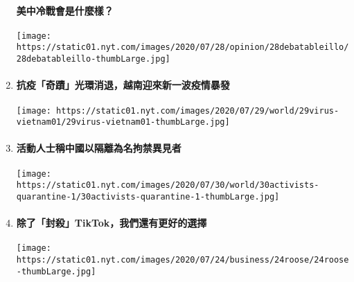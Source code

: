 \begin{enumerate}
  \hypertarget{ux7f8eux4e2dux51b7ux6230ux6703ux662fux4ec0ux9ebcux6a23}{%
  \paragraph{美中冷戰會是什麼樣？}\label{ux7f8eux4e2dux51b7ux6230ux6703ux662fux4ec0ux9ebcux6a23}}

  \texttt{[image: https://static01.nyt.com/images/2020/07/28/opinion/28debatableillo/28debatableillo-thumbLarge.jpg]}
\item
  \href{https://cn.nytimes.com/asia-pacific/20200731/coronavirus-vietnam/zh-hant/?utm_source=top10-in-article\&utm_medium=articlepage\&utm_campaign=web}{}

  \hypertarget{ux6297ux75abux5947ux8e5fux5149ux74b0ux6d88ux9000ux8d8aux5357ux8fceux4f86ux65b0ux4e00ux6ce2ux75abux60c5ux66b4ux767c}{%
  \paragraph{抗疫「奇蹟」光環消退，越南迎來新一波疫情暴發}\label{ux6297ux75abux5947ux8e5fux5149ux74b0ux6d88ux9000ux8d8aux5357ux8fceux4f86ux65b0ux4e00ux6ce2ux75abux60c5ux66b4ux767c}}

  \texttt{[image: https://static01.nyt.com/images/2020/07/29/world/29virus-vietnam01/29virus-vietnam01-thumbLarge.jpg]}
\item
  \href{https://cn.nytimes.com/china/20200731/coronavirus-china-qurantine/zh-hant/?utm_source=top10-in-article\&utm_medium=articlepage\&utm_campaign=web}{}

  \hypertarget{ux6d3bux52d5ux4ebaux58ebux7a31ux4e2dux570bux4ee5ux9694ux96e2ux70baux540dux62d8ux7981ux7570ux898bux8005}{%
  \paragraph{活動人士稱中國以隔離為名拘禁異見者}\label{ux6d3bux52d5ux4ebaux58ebux7a31ux4e2dux570bux4ee5ux9694ux96e2ux70baux540dux62d8ux7981ux7570ux898bux8005}}

  \texttt{[image: https://static01.nyt.com/images/2020/07/30/world/30activists-quarantine-1/30activists-quarantine-1-thumbLarge.jpg]}
\item
  \href{https://cn.nytimes.com/technology/20200728/tiktok-china-ban-model/zh-hant/?utm_source=top10-in-article\&utm_medium=articlepage\&utm_campaign=web}{}

  \hypertarget{ux9664ux4e86ux5c01ux6bbatiktokux6211ux5011ux9084ux6709ux66f4ux597dux7684ux9078ux64c7}{%
  \paragraph{除了「封殺」TikTok，我們還有更好的選擇}\label{ux9664ux4e86ux5c01ux6bbatiktokux6211ux5011ux9084ux6709ux66f4ux597dux7684ux9078ux64c7}}

  \texttt{[image: https://static01.nyt.com/images/2020/07/24/business/24roose/24roose-thumbLarge.jpg]}
\end{enumerate}


